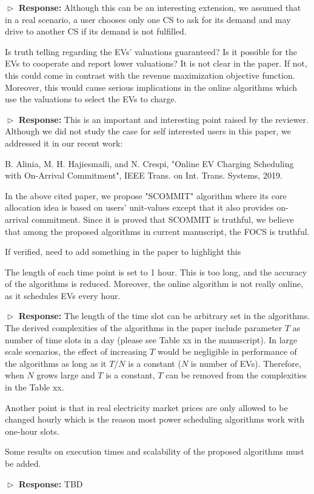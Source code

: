 \documentclass[11pt]{article}
\begin{document}
$\vartriangleright$ \noindent\textbf{Response:} 
Although this can be an interesting extension, we assumed that in a real scenario, a user chooses only one CS to ask for its demand and may drive to another CS if its demand is not fulfilled. 

\vspace{3mm}
{\color{blue} Is truth telling regarding the EVs’ valuations guaranteed? Is it possible for the EVs to cooperate and report lower valuations? It is not clear in the paper. If not, this could come in contrast with the revenue maximization objective function. Moreover, this would cause serious implications in the online algorithms which use the valuations to select the EVs to charge.     }
\vspace{3mm}

$\vartriangleright$ \noindent\textbf{Response:} 
This is an important and interesting point raised by the reviewer. Although we did not study the case for self interested users in this paper, we addressed it in our recent work: 

B. Alinia, M. H. Hajiesmaili, and N. Crespi, "Online EV Charging Scheduling with On-Arrival Commitment", IEEE Trans. on Int. Trans. Systems, 2019.

In the above cited paper, we propose "SCOMMIT" algorithm where its core allocation idea is based on users' unit-values except that it also provides on-arrival commitment. Since it is proved that SCOMMIT is truthful, we believe that among the proposed algorithms in current manuscript, the FOCS is truthful.

{\color{red} If verified, need to add something in the paper to highlight this}

\vspace{3mm}
{\color{blue} The length of each time point is set to 1 hour. This is too long, and the accuracy of the algorithms is reduced. Moreover, the online algorithm is not really online, as it schedules EVs every hour. }
\vspace{3mm}

$\vartriangleright$ \noindent\textbf{Response:} 
The length of the time slot can be arbitrary set in the algorithms. The derived complexities of the algorithms in the paper include parameter $T$ as number of time slots in a day (please see Table xx in the manuscript). In large scale scenarios, the effect of increasing $T$ would be negligible in performance of the algorithms as long as it $T/N$ is a constant ($N$ is number of EVs). Therefore, when $N$ grows large and $T$ is a constant, $T$ can be removed from the complexities in the Table xx. 

Another point is that in real electricity market prices are only allowed to be changed hourly which is the reason most power scheduling algorithms work with one-hour slots.

\vspace{3mm}
{\color{blue} Some results on execution times and scalability of the proposed algorithms must be added.
 }
\vspace{3mm}

$\vartriangleright$ \noindent\textbf{Response:} 
TBD

%
\end{document}
